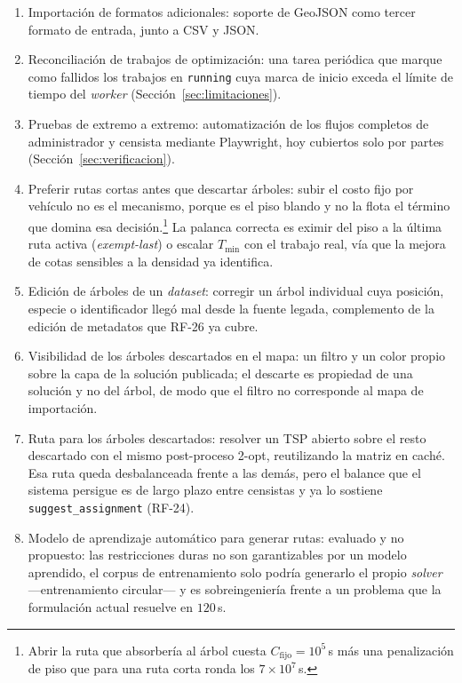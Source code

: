 \begin{enumerate}
  \item Importación de formatos adicionales: soporte de GeoJSON como tercer formato de entrada,
      junto a CSV y JSON.

  \item Reconciliación de trabajos de optimización: una tarea periódica que marque como fallidos
      los trabajos en \texttt{running} cuya marca de inicio exceda el límite de tiempo del
      \textit{worker} (Sección~\ref{sec:limitaciones}).

  \item Pruebas de extremo a extremo: automatización de los flujos completos de administrador y
      censista mediante Playwright, hoy cubiertos solo por partes
      (Sección~\ref{sec:verificacion}).

  \item Preferir rutas cortas antes que descartar árboles: subir el costo fijo por vehículo no es
      el mecanismo, porque es el piso blando y no la flota el término que domina esa
      decisión.\footnote{Abrir la ruta que absorbería al árbol cuesta
      $C_{\text{fijo}} = 10^{5}$\,s más una penalización de piso que para una ruta corta ronda los
      $7\times10^{7}$\,s.} La palanca correcta es eximir del piso a la última ruta activa
      (\textit{exempt-last}) o escalar $T_{\min}$ con el trabajo real, vía que la mejora de cotas
      sensibles a la densidad ya identifica.

  \item Edición de árboles de un \textit{dataset}: corregir un árbol individual cuya posición,
      especie o identificador llegó mal desde la fuente legada, complemento de la edición de
      metadatos que RF-26 ya cubre.

  \item Visibilidad de los árboles descartados en el mapa: un filtro y un color propio sobre la
      capa de la solución publicada; el descarte es propiedad de una solución y no del árbol, de
      modo que el filtro no corresponde al mapa de importación.

  \item Ruta para los árboles descartados: resolver un TSP abierto sobre el resto descartado con el
      mismo post-proceso 2-opt, reutilizando la matriz en caché. Esa ruta queda desbalanceada
      frente a las demás, pero el balance que el sistema persigue es de largo plazo entre censistas
      y ya lo sostiene \texttt{suggest\_assignment} (RF-24).

  \item Modelo de aprendizaje automático para generar rutas: evaluado y no propuesto: las
      restricciones duras no son garantizables por un modelo aprendido, el corpus de entrenamiento
      solo podría generarlo el propio \textit{solver} ---entrenamiento circular--- y es
      sobreingeniería frente a un problema que la formulación actual resuelve en $120$\,s.


\end{enumerate}

